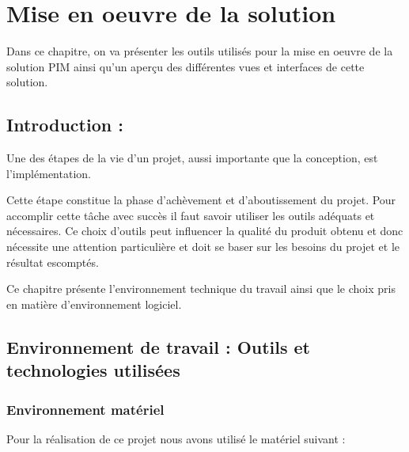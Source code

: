 \chapter{Mise en oeuvre de la solution}

\label{sec:realisation}

\begin{fquote}
Dans ce chapitre, on va présenter les outils utilisés pour la mise en oeuvre de la solution PIM ainsi qu’un aperçu des différentes vues et interfaces de cette solution.
\end{fquote}

\clearpage

\section{Introduction :}

Une des étapes de la vie d’un projet, aussi importante que la conception, est l’implémentation.

\medskip

Cette étape constitue la phase d’achèvement et d’aboutissement du projet. Pour accomplir cette tâche avec succès il faut savoir utiliser les outils adéquats et nécessaires. Ce choix d’outils peut influencer la qualité du produit obtenu et donc nécessite une attention particulière et doit se baser sur les besoins du projet et le résultat escomptés.

\medskip

Ce chapitre présente l’environnement technique du travail ainsi que le choix pris en matière d’environnement logiciel. 

\section{Environnement de travail : Outils et technologies utilisées }
\subsection{Environnement matériel}
Pour la réalisation de ce projet nous avons utilisé le matériel suivant :

